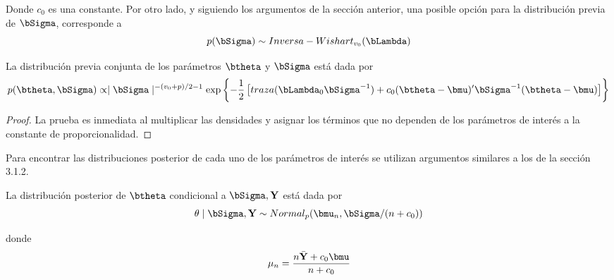 Donde $c_0$ es una constante. Por otro lado, y siguiendo los argumentos de la sección anterior, una posible opción para la distribución previa de $\bSigma$, corresponde a
\begin{equation*}
p(\bSigma)\sim Inversa-Wishart_{v_0}(\bLambda)
\end{equation*}

\begin{Res}
La distribución previa conjunta de los parámetros $\btheta$ y $\bSigma$ está dada por
\begin{equation*}
p(\btheta,\bSigma) \propto \mid \bSigma \mid ^{-(v_0+p)/2-1}
\exp\left\{ -\frac{1}{2}\left[traza(\bLambda_0\bSigma^{-1})+
c_0(\btheta-\bmu)'\bSigma^{-1}(\btheta-\bmu)\right]\right\}
\end{equation*}
\end{Res}
                              
\begin{proof}
La prueba es inmediata al multiplicar las densidades y asignar los términos que no dependen de los parámetros de interés a la constante de proporcionalidad.
\end{proof}
                              
Para encontrar las distribuciones posterior de cada uno de los parámetros de interés se utilizan argumentos similares a los de la sección 3.1.2.
                              
\begin{Res}
La distribución posterior de $\btheta$ condicional a $\bSigma,\mathbf{Y}$ está dada por
\begin{equation*}
\theta \mid \bSigma,\mathbf{Y} \sim Normal_p(\bmu_n,\bSigma/(n+c_0))
\end{equation*}

donde
\begin{equation*}
\mu_n=\frac{n\bar{\mathbf{Y}}+c_0\bmu}{n+c_0}
\end{equation*}
\end{Res}

